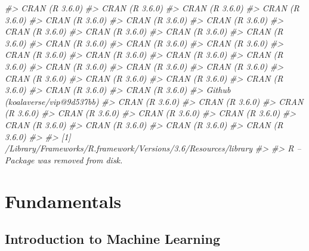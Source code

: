 \documentclass[]{krantz}
\makeatletter
\newenvironment{Shaded}{\begin{snugshade}}{\end{snugshade}}
\newcommand{\CommentTok}[1]{\textcolor[rgb]{0.37,0.37,0.37}{\textit{#1}}}
\newenvironment{kframe}{%
\medskip{}
\setlength{\fboxsep}{.8em}
 \def\at@end@of@kframe{}%
 \ifinner\ifhmode%
  \def\at@end@of@kframe{\end{minipage}}%
  \begin{minipage}{\columnwidth}%
 \fi\fi%
 \def\FrameCommand##1{\hskip\@totalleftmargin \hskip-\fboxsep
 \colorbox{shadecolor}{##1}\hskip-\fboxsep
     \hskip-\linewidth \hskip-\@totalleftmargin \hskip\columnwidth}%
 \MakeFramed {\advance\hsize-\width
   \@totalleftmargin\z@ \linewidth\hsize
   \@setminipage}}%
 {\par\unskip\endMakeFramed%
 \at@end@of@kframe}
\renewenvironment{Shaded}{\begin{kframe}}{\end{kframe}}
\makeatother
\begin{document}
\begin{Shaded}
\begin{Highlighting}[]
\CommentTok{#>  CRAN (R 3.6.0)                 }
\CommentTok{#>  CRAN (R 3.6.0)                 }
\CommentTok{#>  CRAN (R 3.6.0)                 }
\CommentTok{#>  CRAN (R 3.6.0)                 }
\CommentTok{#>  CRAN (R 3.6.0)                 }
\CommentTok{#>  CRAN (R 3.6.0)                 }
\CommentTok{#>  CRAN (R 3.6.0)                 }
\CommentTok{#>  CRAN (R 3.6.0)                 }
\CommentTok{#>  CRAN (R 3.6.0)                 }
\CommentTok{#>  CRAN (R 3.6.0)                 }
\CommentTok{#>  CRAN (R 3.6.0)                 }
\CommentTok{#>  CRAN (R 3.6.0)                 }
\CommentTok{#>  CRAN (R 3.6.0)                 }
\CommentTok{#>  CRAN (R 3.6.0)                 }
\CommentTok{#>  CRAN (R 3.6.0)                 }
\CommentTok{#>  CRAN (R 3.6.0)                 }
\CommentTok{#>  CRAN (R 3.6.0)                 }
\CommentTok{#>  CRAN (R 3.6.0)                 }
\CommentTok{#>  CRAN (R 3.6.0)                 }
\CommentTok{#>  CRAN (R 3.6.0)                 }
\CommentTok{#>  CRAN (R 3.6.0)                 }
\CommentTok{#>  CRAN (R 3.6.0)                 }
\CommentTok{#>  CRAN (R 3.6.0)                 }
\CommentTok{#>  CRAN (R 3.6.0)                 }
\CommentTok{#>  CRAN (R 3.6.0)                 }
\CommentTok{#>  CRAN (R 3.6.0)                 }
\CommentTok{#>  CRAN (R 3.6.0)                 }
\CommentTok{#>  Github (koalaverse/vip@9d537bb)}
\CommentTok{#>  CRAN (R 3.6.0)                 }
\CommentTok{#>  CRAN (R 3.6.0)                 }
\CommentTok{#>  CRAN (R 3.6.0)                 }
\CommentTok{#>  CRAN (R 3.6.0)                 }
\CommentTok{#>  CRAN (R 3.6.0)                 }
\CommentTok{#>  CRAN (R 3.6.0)                 }
\CommentTok{#>  CRAN (R 3.6.0)                 }
\CommentTok{#>  CRAN (R 3.6.0)                 }
\CommentTok{#>  CRAN (R 3.6.0)                 }
\CommentTok{#>  CRAN (R 3.6.0)                 }
\CommentTok{#> }
\CommentTok{#> [1] /Library/Frameworks/R.framework/Versions/3.6/Resources/library}
\CommentTok{#> }
\CommentTok{#>  R -- Package was removed from disk.}
\end{Highlighting}
\end{Shaded}

\mainmatter

\hypertarget{part-fundamentals}{%
\part{Fundamentals}\label{part-fundamentals}}

\hypertarget{intro}{%
\chapter{Introduction to Machine Learning}\label{intro}}
\end{document}
